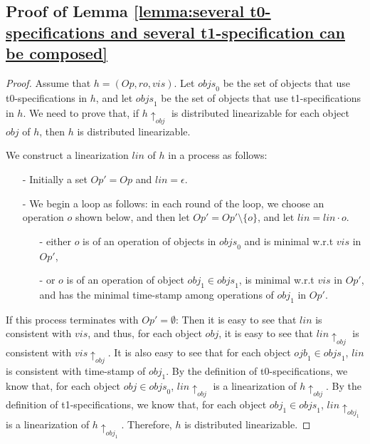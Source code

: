 {\subsection{Proof of Lemma \ref{lemma:several t0-specifications and several t1-specification can be composed}}
\label{subsec:appendix proofs of lemma several t0-specifications and several t1-specification can be composed}


\composingTZeroAndTOne*
\begin {proof}
Assume that $h = (\mathit{Op},\mathit{ro},\mathit{vis})$. Let $\mathit{objs}_0$ be the set of objects that use t0-specifications in $h$, and let $\mathit{objs}_1$ be the set of objects that use t1-specifications in $h$. We need to prove that, if $h \uparrow_{\mathit{obj}}$ is distributed linearizable for each object $\mathit{obj}$ of $h$, then $h$ is distributed linearizable.

We construct a linearization $\mathit{lin}$ of $h$ in a process as follows:

\begin{itemize}
\setlength{\itemsep}{0.5pt}
\item[-] Initially a set $\mathit{Op}' = \mathit{Op}$ and $\mathit{lin} = \epsilon$.

\item[-] We begin a loop as follows: in each round of the loop, we choose an operation $o$ shown below, and then let $\mathit{Op}' = \mathit{Op}' \setminus \{ o \}$, and let $\mathit{lin} = \mathit{lin} \cdot o$.

    \begin{itemize}
    \setlength{\itemsep}{0.5pt}
    \item[-] either $o$ is of an operation of objects in $\mathit{objs}_0$ and is minimal w.r.t $\mathit{vis}$ in $\mathit{Op}'$,

    \item[-] or $o$ is of an operation of object $\mathit{obj}_1 \in \mathit{objs}_1$, is minimal w.r.t $\mathit{vis}$ in $\mathit{Op}'$, and has the minimal time-stamp among operations of $\mathit{obj}_1$ in $\mathit{Op}'$.
    \end{itemize}
\end{itemize}

If this process terminates with $\mathit{Op}' = \emptyset$: Then it is easy to see that $\mathit{lin}$ is consistent with $\mathit{vis}$, and thus, for each object $\mathit{obj}$, it is easy to see that $\mathit{lin} \uparrow_{\mathit{obj}}$ is consistent with $\mathit{vis} \uparrow_{\mathit{obj}}$. It is also easy to see that for each object $\mathit{ojb}_1 \in \mathit{objs}_1$, $\mathit{lin}$ is consistent with time-stamp of $\mathit{obj}_1$. By the definition of t0-specifications, we know that, for each object $\mathit{obj} \in \mathit{objs}_0$, $\mathit{lin} \uparrow_{\mathit{obj}}$ is a linearization of $h \uparrow_{\mathit{obj}}$. By the definition of t1-specifications, we know that, for each object $\mathit{obj}_1 \in \mathit{objs}_1$, $\mathit{lin} \uparrow_{\mathit{obj}_1}$ is a linearization of $h \uparrow_{\mathit{obj}_1}$. Therefore, $h$ is distributed linearizable.


\end{proof}}
